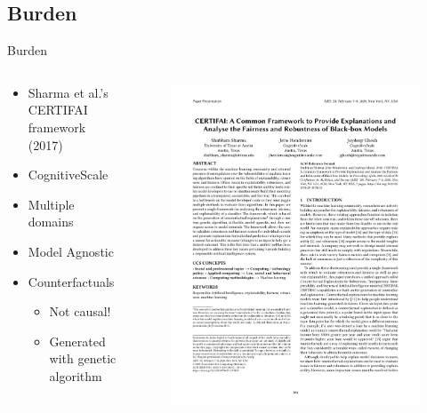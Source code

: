 \documentclass[handout,aspectratio=169]{beamer}
\begin{document}
\subsection{Burden}

\begin{frame}{Burden}
    \begin{columns}
        \begin{column}{0.5\textwidth}
            \begin{itemize}
                \item Sharma et al.'s CERTIFAI framework \cite{certifai} (2017)
                \item CognitiveScale
                \item Multiple domains
                \item Model Agnostic
                \item Counterfactuals
                \begin{itemize}
                    \item \alert{Not causal!}
                    \item Generated with genetic algorithm
                \end{itemize}
            \end{itemize}
        \end{column}
        \begin{column}{0.5\textwidth}
            \begin{figure}
                \centering
                \includegraphics[width=\textwidth]{img/certifai.pdf}

\end{figure}
\end{column}
\end{columns}
\end{frame}
\end{document}
